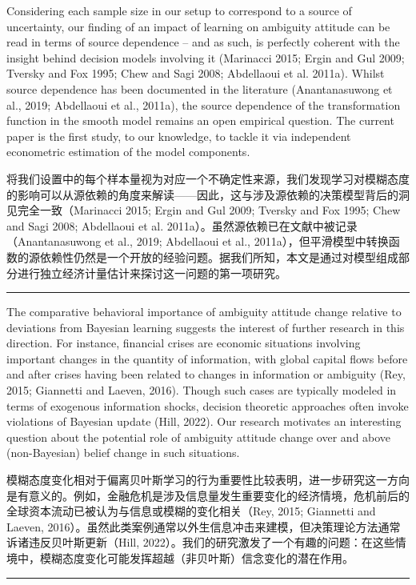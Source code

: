 \documentclass[12pt,a4paper]{article}
\newenvironment{original}
  {\par\vspace{0.5em}\noindent\color{black}\ignorespaces}
  {\par\vspace{0.3em}}
\newenvironment{translation}
  {\par\noindent\color{transblue}\ignorespaces}
  {\par\vspace{0.8em}\hrule\vspace{0.5em}}
\begin{document}
\begin{original}
Considering each sample size in our setup to correspond to a source of uncertainty, our finding of an impact of learning on ambiguity attitude can be read in terms of source dependence -- and as such, is perfectly coherent with the insight behind decision models involving it (Marinacci 2015; Ergin and Gul 2009; Tversky and Fox 1995; Chew and Sagi 2008; Abdellaoui et al. 2011a). Whilst source dependence has been documented in the literature (Anantanasuwong et al., 2019; Abdellaoui et al., 2011a), the source dependence of the transformation function in the smooth model remains an open empirical question. The current paper is the first study, to our knowledge, to tackle it via independent econometric estimation of the model components.
\end{original}

\begin{translation}
将我们设置中的每个样本量视为对应一个不确定性来源，我们发现学习对模糊态度的影响可以从源依赖的角度来解读——因此，这与涉及源依赖的决策模型背后的洞见完全一致（Marinacci 2015; Ergin and Gul 2009; Tversky and Fox 1995; Chew and Sagi 2008; Abdellaoui et al. 2011a）。虽然源依赖已在文献中被记录（Anantanasuwong et al., 2019; Abdellaoui et al., 2011a），但平滑模型中转换函数的源依赖性仍然是一个开放的经验问题。据我们所知，本文是通过对模型组成部分进行独立经济计量估计来探讨这一问题的第一项研究。
\end{translation}

\begin{original}
The comparative behavioral importance of ambiguity attitude change relative to deviations from Bayesian learning suggests the interest of further research in this direction. For instance, financial crises are economic situations involving important changes in the quantity of information, with global capital flows before and after crises having been related to changes in information or ambiguity (Rey, 2015; Giannetti and Laeven, 2016). Though such cases are typically modeled in terms of exogenous information shocks, decision theoretic approaches often invoke violations of Bayesian update (Hill, 2022). Our research motivates an interesting question about the potential role of ambiguity attitude change over and above (non-Bayesian) belief change in such situations.
\end{original}

\begin{translation}
模糊态度变化相对于偏离贝叶斯学习的行为重要性比较表明，进一步研究这一方向是有意义的。例如，金融危机是涉及信息量发生重要变化的经济情境，危机前后的全球资本流动已被认为与信息或模糊的变化相关（Rey, 2015; Giannetti and Laeven, 2016）。虽然此类案例通常以外生信息冲击来建模，但决策理论方法通常诉诸违反贝叶斯更新（Hill, 2022）。我们的研究激发了一个有趣的问题：在这些情境中，模糊态度变化可能发挥超越（非贝叶斯）信念变化的潜在作用。
\end{translation}
\end{document}
